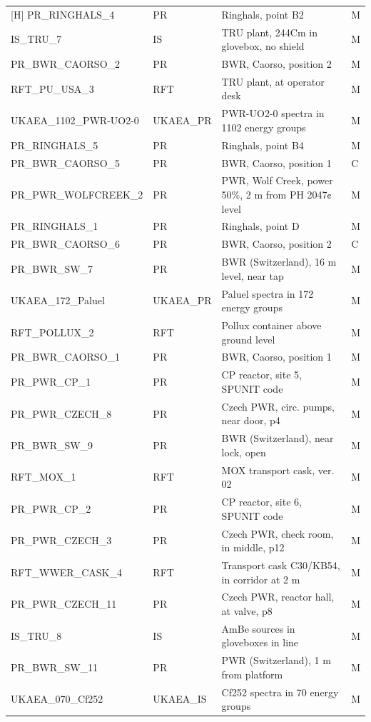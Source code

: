 \documentclass[a4paper, 12pt]{article}
\begin{document}
\begin{appendices}
\begin{longtable}{llll}[H]
PR\_RINGHALS\_4 & PR & Ringhals, point B2  & M\\
IS\_TRU\_7 & IS & TRU plant, 244Cm in glovebox, no shield  & M\\
PR\_BWR\_CAORSO\_2 & PR & BWR, Caorso, position 2  & M\\
RFT\_PU\_USA\_3 & RFT & TRU plant, at operator desk  & M\\
UKAEA\_1102\_PWR-UO2-0 & UKAEA\_PR & PWR-UO2-0 spectra in 1102 energy groups & M\\
PR\_RINGHALS\_5 & PR & Ringhals, point B4  & M\\
PR\_BWR\_CAORSO\_5 & PR & BWR, Caorso, position 1  & C\\
PR\_PWR\_WOLFCREEK\_2 & PR & PWR, Wolf Creek, power 50\%, 2 m from PH 2047¢ level  & M\\
PR\_RINGHALS\_1 & PR & Ringhals, point D  & M\\
PR\_BWR\_CAORSO\_6 & PR & BWR, Caorso, position 2  & C\\
PR\_BWR\_SW\_7 & PR & BWR (Switzerland), 16 m level, near tap  & M\\
UKAEA\_172\_Paluel & UKAEA\_PR & Paluel spectra in 172 energy groups & M\\
RFT\_POLLUX\_2 & RFT & Pollux container above ground level  & M\\
PR\_BWR\_CAORSO\_1 & PR & BWR, Caorso, position 1  & M\\
PR\_PWR\_CP\_1 & PR & CP reactor, site 5, SPUNIT code  & M\\
PR\_PWR\_CZECH\_8 & PR & Czech PWR, circ. pumps, near door, p4  & M\\
PR\_BWR\_SW\_9 & PR & BWR (Switzerland), near lock, open  & M\\
RFT\_MOX\_1 & RFT & MOX transport cask, ver. 02  & M\\
PR\_PWR\_CP\_2 & PR & CP reactor, site 6, SPUNIT code  & M\\
PR\_PWR\_CZECH\_3 & PR & Czech PWR, check room, in middle, p12  & M\\
RFT\_WWER\_CASK\_4 & RFT & Transport cask C30/KB54, in corridor at 2 m  & M\\
PR\_PWR\_CZECH\_11 & PR & Czech PWR, reactor hall, at valve, p8  & M\\
IS\_TRU\_8 & IS & AmBe sources in gloveboxes in line  & M\\
PR\_BWR\_SW\_11 & PR & PWR (Switzerland), 1 m from platform  & M\\
UKAEA\_070\_Cf252 & UKAEA\_IS & Cf252 spectra in 70 energy groups & M\\

\end{longtable}
\end{appendices}
\end{document}
